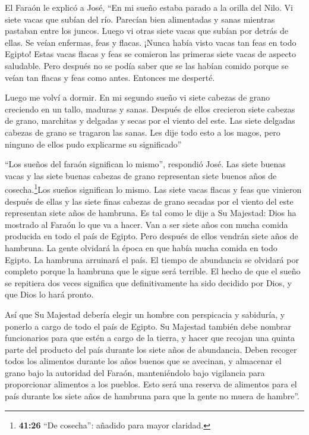  El Faraón le explicó a José, ``En mi sueño estaba parado a
la orilla del Nilo.  Vi siete vacas que subían del río.
Parecían bien alimentadas y sanas mientras pastaban entre los juncos.
 Luego vi otras siete vacas que subían por detrás de ellas.
Se veían enfermas, feas y flacas. ¡Nunca había visto vacas tan feas en
todo Egipto!  Estas vacas flacas y feas se comieron las
primeras siete vacas de aspecto saludable.  Pero después no
se podía saber que se las habían comido porque se veían tan flacas y
feas como antes. Entonces me desperté.

 Luego me volví a dormir. En mi segundo sueño vi siete
cabezas de grano creciendo en un tallo, maduras y sanas. 
Después de ellos crecieron siete cabezas de grano, marchitas y delgadas
y secas por el viento del este.  Las siete delgadas cabezas
de grano se tragaron las sanas. Les dije todo esto a los magos, pero
ninguno de ellos pudo explicarme su significado''

 ``Los sueños del faraón significan lo mismo'', respondió
José.  Las siete buenas vacas y las siete buenas cabezas de
grano representan siete buenos años de cosecha.\footnote{\textbf{41:26}
  ``De cosecha'': añadido para mayor claridad.}Los sueños significan lo
mismo.  Las siete vacas flacas y feas que vinieron después
de ellas y las siete finas cabezas de grano secadas por el viento del
este representan siete años de hambruna.  Es tal como le
dije a Su Majestad: Dios ha mostrado al Faraón lo que va a hacer.
 Van a ser siete años con mucha comida producida en todo el
país de Egipto.  Pero después de ellos vendrán siete años
de hambruna. La gente olvidará la época en que había mucha comida en
todo Egipto. La hambruna arruinará el país.  El tiempo de
abundancia se olvidará por completo porque la hambruna que le sigue será
terrible.  El hecho de que el sueño se repitiera dos veces
significa que definitivamente ha sido decidido por Dios, y que Dios lo
hará pronto.

 Así que Su Majestad debería elegir un hombre con
perspicacia y sabiduría, y ponerlo a cargo de todo el país de Egipto.
 Su Majestad también debe nombrar funcionarios para que
estén a cargo de la tierra, y hacer que recojan una quinta parte del
producto del país durante los siete años de abundancia. 
Deben recoger todos los alimentos durante los años buenos que se
avecinan, y almacenar el grano bajo la autoridad del Faraón,
manteniéndolo bajo vigilancia para proporcionar alimentos a los pueblos.
 Esto será una reserva de alimentos para el país durante
los siete años de hambruna para que la gente no muera de hambre''.

